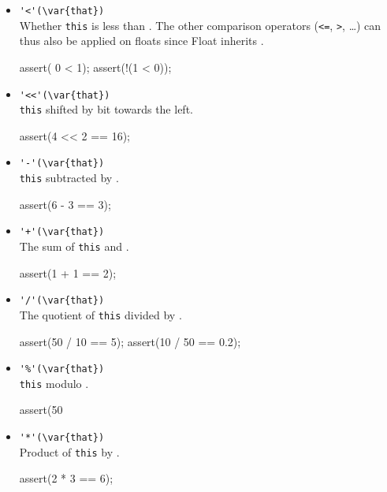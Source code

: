 \begin{itemize}
\item \lstinline|'<'(\var{that})|\\
  Whether \lstinline|this| is less than . The other comparison
  operators (\lstinline|<=|, \lstinline|>|, \ldots) can thus also be
  applied on floats since Float inherits .
\begin{urbiscript}[firstnumber=last]
assert(  0 < 1);
assert(!(1 < 0));
\end{urbiscript}

\item \lstinline|'<<'(\var{that})|\\
  \lstinline|this| shifted by  bit towards the left.
\begin{urbiscript}[firstnumber=last]
assert(4 << 2 == 16);
\end{urbiscript}

\item \lstinline|'-'(\var{that})|\\
  \lstinline|this| subtracted by .
\begin{urbiscript}[firstnumber=last]
assert(6 - 3 == 3);
\end{urbiscript}

\item \lstinline|'+'(\var{that})|\\
  The sum of \lstinline|this| and .
\begin{urbiscript}[firstnumber=last]
assert(1 + 1 == 2);
\end{urbiscript}

\item \lstinline|'/'(\var{that})|\\
  The quotient of \lstinline|this| divided by .
\begin{urbiscript}[firstnumber=last]
assert(50 / 10 == 5);
assert(10 / 50 == 0.2);
\end{urbiscript}

\item \lstinline|'%'(\var{that})|\\
  \lstinline|this| modulo .
\begin{urbiscript}[firstnumber=last]
assert(50 %
\end{urbiscript}

\item \lstinline|'*'(\var{that})|\\
  Product of \lstinline|this| by .
\begin{urbiscript}[firstnumber=last]
assert(2 * 3 == 6);
\end{urbiscript}


\end{itemize}
